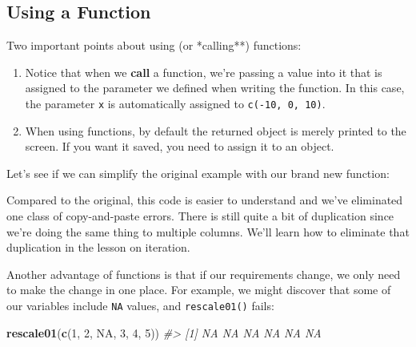 \documentclass[]{book}
\newenvironment{Shaded}{\begin{snugshade}}{\end{snugshade}}
\newcommand{\CommentTok}[1]{\textcolor[rgb]{0.56,0.35,0.01}{\textit{#1}}}
\newcommand{\DecValTok}[1]{\textcolor[rgb]{0.00,0.00,0.81}{#1}}
\newcommand{\KeywordTok}[1]{\textcolor[rgb]{0.13,0.29,0.53}{\textbf{#1}}}
\newcommand{\NormalTok}[1]{#1}
\newcommand{\OperatorTok}[1]{\textcolor[rgb]{0.81,0.36,0.00}{\textbf{#1}}}
\newcommand{\OtherTok}[1]{\textcolor[rgb]{0.56,0.35,0.01}{#1}}
\newcommand{\StringTok}[1]{\textcolor[rgb]{0.31,0.60,0.02}{#1}}
\begin{document}
\hypertarget{using-a-function}{%
\subsection{Using a Function}\label{using-a-function}}

Two important points about using (or *calling**) functions:

\begin{enumerate}
\def\labelenumi{\arabic{enumi}.}
\item
  Notice that when we \textbf{call} a function, we're passing a value into it that is assigned to the parameter we defined when writing the function. In this case, the parameter \texttt{x} is automatically assigned to \texttt{c(-10,\ 0,\ 10)}.
\item
  When using functions, by default the returned object is merely printed to the screen. If you want it saved, you need to assign it to an object.
\end{enumerate}

Let's see if we can simplify the original example with our brand new function:

\begin{Shaded}
\end{Shaded}

Compared to the original, this code is easier to understand and we've eliminated one class of copy-and-paste errors. There is still quite a bit of duplication since we're doing the same thing to multiple columns. We'll learn how to eliminate that duplication in the lesson on iteration.

Another advantage of functions is that if our requirements change, we only need to make the change in one place. For example, we might discover that some of our variables include \texttt{NA} values, and \texttt{rescale01()} fails:

\begin{Shaded}
\begin{Highlighting}[]
\KeywordTok{rescale01}\NormalTok{(}\KeywordTok{c}\NormalTok{(}\DecValTok{1}\NormalTok{, }\DecValTok{2}\NormalTok{, }\OtherTok{NA}\NormalTok{, }\DecValTok{3}\NormalTok{, }\DecValTok{4}\NormalTok{, }\DecValTok{5}\NormalTok{))}
\CommentTok{#> [1] NA NA NA NA NA NA}
\end{Highlighting}
\end{Shaded}
\end{document}
